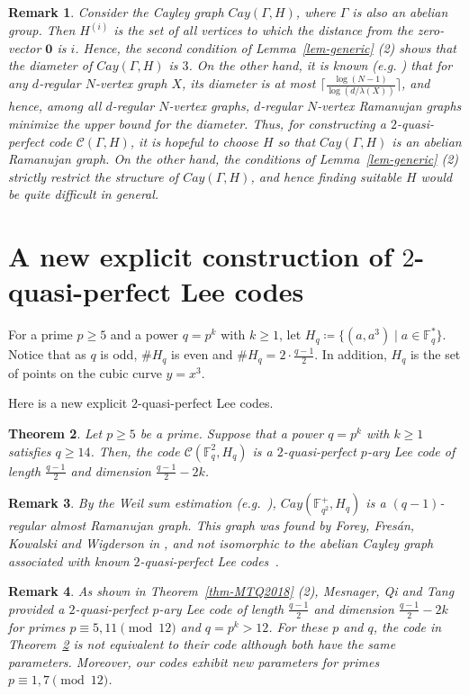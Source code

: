 \documentclass{amsart}
\newtheorem{theorem}{Theorem}%
\newtheorem{remark}[theorem]{Remark}
\numberwithin{equation}{section}
\newcommand{\F}{\mathbb{F}}
\begin{document}
\begin{remark}
Consider the Cayley graph $Cay(\Gamma, H)$, where $\Gamma$ is also an abelian group. 
Then $H^{(i)}$ is the set of all vertices to which the distance from the zero-vector $\mathbf{0}$ is $i$. 
Hence, the second condition of Lemma~\ref{lem-generic} (2) shows that the diameter of $Cay(\Gamma, H)$ is $3$.
On the other hand, it is known (e.g. \cite{C1989}) that for any $d$-regular $N$-vertex graph $X$, its diameter is at most $\lceil \frac{\log(N-1)}{\log(d/\lambda(X))} \rceil$, and hence, among all $d$-regular $N$-vertex graphs, $d$-regular $N$-vertex Ramanujan graphs minimize the upper bound for the diameter. 
Thus, for constructing a $2$-quasi-perfect code $\mathcal{C}(\Gamma,H)$, it is hopeful to choose $H$ so that $Cay(\Gamma, H)$ is an abelian Ramanujan graph.
On the other hand, the conditions of Lemma~\ref{lem-generic} (2) strictly restrict the structure of $Cay(\Gamma, H)$, and hence finding suitable $H$ would be quite difficult in general.  
\end{remark}


\section{A new explicit construction of $2$-quasi-perfect Lee codes}
\label{sect-main}
For a prime $p\geq 5$ and a power $q=p^k$ with $k\geq 1$, let $H_q\coloneq \{(a, a^3) \mid a \in \F_q^*\}$.
Notice that as $q$ is odd, $\#H_q$ is even and  $\#H_q=2\cdot \frac{q-1}{2}$.
In addition, $H_q$ is the set of points on the cubic curve $y=x^3$. 

Here is a new explicit $2$-quasi-perfect Lee codes.
\begin{theorem}
\label{thm-main}
Let $p \geq 5$ be a prime. Suppose that a power $q=p^k$ with $k\geq 1$ satisfies $q\geq 14$.
Then, the code $\mathcal{C}(\F_q^2, H_q)$ is a $2$-quasi-perfect $p$-ary Lee code of length $\frac{q-1}{2}$ and dimension $\frac{q-1}{2}-2k$. 
\end{theorem}

\begin{remark}
By the Weil sum estimation (e.g.~\cite{LN1983}), $Cay(\F_{q^2}^+, H_q)$ is a $(q-1)$-regular almost Ramanujan graph.
This graph was found by Forey, Fres\'{a}n, Kowalski and Wigderson in \cite{FFKW2025}, and not isomorphic to the abelian Cayley graph associated with known $2$-quasi-perfect Lee codes~\cite{BKS2016,MTQ2018}.
\end{remark}

\begin{remark}
As shown in Theorem~\ref{thm-MTQ2018} (2), Mesnager, Qi and Tang provided a
$2$-quasi-perfect $p$-ary Lee code of length $\frac{q-1}{2}$ and dimension $\frac{q-1}{2}-2k$ for primes $p\equiv 5, 11 \pmod{12}$ and $q=p^k>12$. 
For these $p$ and $q$, the code in Theorem~\ref{thm-main} is not equivalent to their code although both have the same parameters.
Moreover, our codes exhibit new parameters for primes $p\equiv 1, 7 \pmod{12}$.
\end{remark}
\end{document}
